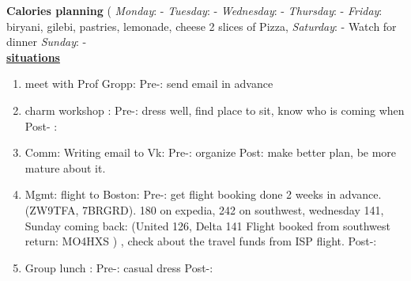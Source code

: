 \textbf{Calories planning}
{\small (
\textit{Monday}: -
\textit{Tuesday}: -
\textit{Wednesday}: -
\textit{Thursday}: -
\textit{Friday}: biryani, gilebi, pastries, lemonade, cheese 2 slices of Pizza,
\textit{Saturday}: -  Watch for dinner
\textit{Sunday}: -
 }\\

\underline{\textbf{situations}}\\
\begin{enumerate}
\item \small meet with Prof Gropp: Pre-:  send email in advance


\item \small charm workshop :  Pre-: dress well, find place to sit, know who is coming when Post- :

\item \small Comm: Writing email to Vk: Pre-:  organize Post: make
better plan, be more mature about it.

\item \small Mgmt: flight to Boston:  Pre-: get flight booking done 2
weeks in advance. (ZW9TFA, 7BRGRD). 180 on expedia, 242 on southwest,
wednesday 141, Sunday coming back: (United 126, Delta 141
Flight booked from southwest return:  MO4HXS )  , check about the
travel funds from ISP flight.  Post-:

\item \small Group lunch :  Pre-:  casual dress  Post-:

\end{enumerate}
\newpage

